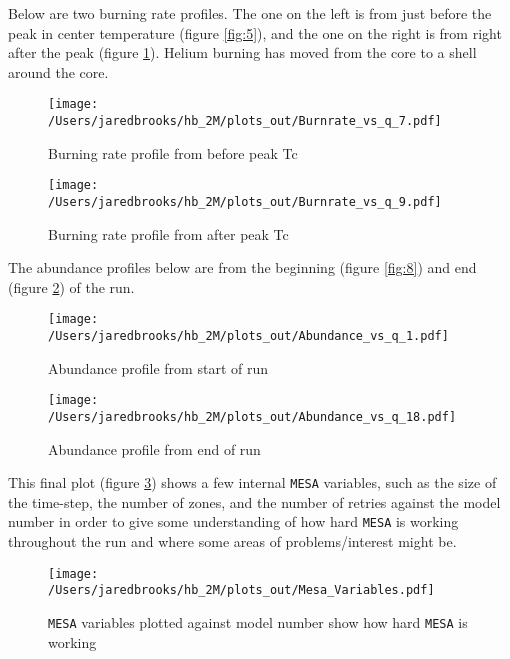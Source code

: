 \documentclass{article}
\begin{document}
        \pagebreak

        Below are two burning rate profiles.  The one on the left is from just before the peak in center temperature (figure \ref{fig:5}), and the one on the right is from right after the peak (figure \ref{fig:6}).  Helium burning has moved from the core to a shell around the core.

        \begin{figure}[H]
          \begin{minipage}[b]{0.5\linewidth}
            \centering
            \texttt{[image: /Users/jaredbrooks/hb\_2M/plots\_out/Burnrate\_vs\_q\_7.pdf]}
            \caption{Burning rate profile from before peak Tc}
            \label{fig:5}
          \end{minipage}
          \hspace{0cm}
          \begin{minipage}[b]{0.5\linewidth}
            \centering
            \texttt{[image: /Users/jaredbrooks/hb\_2M/plots\_out/Burnrate\_vs\_q\_9.pdf]}
            \caption{Burning rate profile from after peak Tc}
            \label{fig:6}
          \end{minipage}
        \end{figure}

        \pagebreak

        The abundance profiles below are from the beginning (figure \ref{fig:8}) and end (figure \ref{fig:9}) of the run.

        \begin{figure}[H]
          \begin{minipage}[b]{0.5\linewidth}
            \centering
            \texttt{[image: /Users/jaredbrooks/hb\_2M/plots\_out/Abundance\_vs\_q\_1.pdf]}
            \caption{Abundance profile from start of run}
            \label{fig:8}
          \end{minipage}
          \hspace{0cm}
          \begin{minipage}[b]{0.5\linewidth}
            \centering
            \texttt{[image: /Users/jaredbrooks/hb\_2M/plots\_out/Abundance\_vs\_q\_18.pdf]}
            \caption{Abundance profile from end of run}
            \label{fig:9}
          \end{minipage}
        \end{figure}

        \pagebreak

        This final plot (figure \ref{fig:7}) shows a few internal \texttt{MESA} variables, such as the size of the time-step, the number of zones, and the number of retries against the model number in order to give some understanding of how hard \texttt{MESA} is working throughout the run and where some areas of problems/interest might be.

        \begin{figure}[H]
          \centering
          \texttt{[image: /Users/jaredbrooks/hb\_2M/plots\_out/Mesa\_Variables.pdf]}
          \caption{\texttt{MESA} variables plotted against model number show how hard \texttt{MESA} is working}
          \label{fig:7}
        \end{figure}
\end{document}
